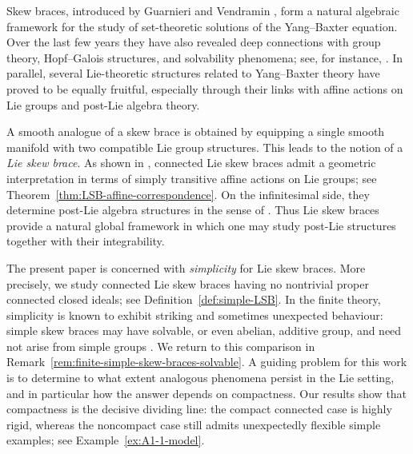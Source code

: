 \documentclass[reqno]{amsart}
\begin{document}
Skew braces, introduced by Guarnieri and Vendramin
\cite{Guarnieri2017}, form a natural algebraic framework for the study
of set-theoretic solutions of the Yang--Baxter equation. Over the last
few years they have also revealed deep connections with group theory,
Hopf--Galois structures, and solvability phenomena; see, for instance,
\cite{Guarnieri2017,Smoktunowicz2018,Bachiller2016Counterexample,Byott2024,BBEJP}.
In parallel, several Lie-theoretic structures related to Yang--Baxter
theory have proved to be equally fruitful, especially through their
links with affine actions on Lie groups and post-Lie algebra theory.

A smooth analogue of a skew brace is obtained by equipping a single
smooth manifold with two compatible Lie group structures. This leads
to the notion of a \emph{Lie skew brace}. As shown in
\cite{DameleLoi2026}, connected Lie skew braces admit a geometric
interpretation in terms of simply transitive affine actions on Lie
groups; see Theorem~\ref{thm:LSB-affine-correspondence}. On the
infinitesimal side, they determine post-Lie algebra structures in the
sense of \cite{BaiGuoShengTang2023,Burde2012affineaction}. Thus Lie
skew braces provide a natural global framework in which one may study
post-Lie structures together with their integrability.

The present paper is concerned with \emph{simplicity} for Lie skew
braces. More precisely, we study connected Lie skew braces having no
nontrivial proper connected closed ideals; see
Definition~\ref{def:simple-LSB}. 
In the finite theory, simplicity is known to exhibit striking and
sometimes unexpected behaviour: simple skew braces may have solvable,
or even abelian, additive group, and need not arise from simple groups
\cite{Bachiller2016Counterexample,Byott2024simple}. We return to this
comparison in Remark~\ref{rem:finite-simple-skew-braces-solvable}.
A guiding problem
for this work is to determine to what extent analogous phenomena
persist in the Lie setting, and in particular how the answer depends
on compactness.
Our results show that compactness is the decisive dividing line: the
compact connected case is highly rigid, whereas the noncompact case
still admits unexpectedly flexible simple examples; see
Example~\ref{ex:A1-1-model}.

\end{document}
